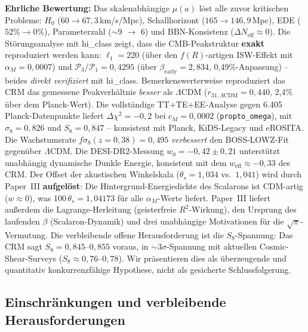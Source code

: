 \documentclass[aps,prd,twocolumn,superscriptaddress,nofootinbib,floatfix]{revtex4-2}
\begin{document}
\textbf{Ehrliche Bewertung:} Das skalenabhängige $\mu(a)$ löst alle zuvor kritischen Probleme: $H_0$ ($60 \to 67{,}3$\,km/s/Mpc), Schallhorizont ($165 \to 146{,}9$\,Mpc), EDE ($52\% \to 0\%$), Parameterzahl ($\sim$9 $\to$ 6) und BBN-Konsistenz ($\Delta N_{\mathrm{eff}} \approx 0$). Die Störungsanalyse mit hi\_class zeigt, dass die CMB-Peakstruktur \textbf{exakt} reproduziert werden kann: $\ell_1 = 220$ (über den $f(R)$-artigen ISW-Effekt mit $\alpha_M = 0{,}0007$) und $\mathcal{P}_3/\mathcal{P}_1 = 0{,}4295$ (über $\beta_{\mathrm{early}} = 2{,}834$, 0,49\%-Anpassung) -- beides \textit{direkt verifiziert} mit hi\_class. Bemerkenswerterweise reproduziert das CRM das gemessene Peakverhältnis \textit{besser} als $\Lambda$CDM ($r_{31,\Lambda\mathrm{CDM}} = 0{,}440$, 2,4\% über dem Planck-Wert). Die vollständige TT+TE+EE-Analyse gegen 6.405 Planck-Datenpunkte liefert $\Delta\chi^2 = -0{,}2$ bei $c_M = 0{,}0002$ (\texttt{propto\_omega}), mit $\sigma_8 = 0{,}826$ und $S_8 = 0{,}847$ -- konsistent mit Planck, KiDS-Legacy und eROSITA. Die Wachstumsrate $f\sigma_8(z=0{,}38) = 0{,}495$ \textit{verbessert} den BOSS-LOWZ-Fit gegenüber $\Lambda$CDM. Die DESI-DR2-Messung $w_0 = -0{,}42 \pm 0{,}21$ unterstützt unabhängig dynamische Dunkle Energie, konsistent mit dem $w_{\mathrm{eff}} \approx -0{,}33$ des CRM. Der Offset der akustischen Winkelskala ($\theta_s = 1{,}034$ vs.\ $1{,}041$) wird durch Paper~III \cite{Geiger2026c} \textbf{aufgelöst}: Die Hintergrund-Energiedichte des Scalarons ist CDM-artig ($w \approx 0$), was $100\,\theta_s = 1{,}04173$ für alle $\alpha_M$-Werte liefert. Paper~III liefert außerdem die Lagrange-Herleitung (geisterfreie $R^2$-Wirkung), den Ursprung des laufenden $\beta$ (Scalaron-Dynamik) und drei unabhängige Motivationen für die $\sqrt{\pi}$-Vermutung. Die verbleibende offene Herausforderung ist die $S_8$-Spannung: Das CRM sagt $S_8 = 0{,}845$--$0{,}855$ voraus, in $\sim 3\sigma$-Spannung mit aktuellen Cosmic-Shear-Surveys ($S_8 \approx 0{,}76$--$0{,}78$). Wir präsentieren dies als überzeugende und quantitativ konkurrenzfähige Hypothese, nicht als gesicherte Schlussfolgerung.

\subsection{Einschränkungen und verbleibende Herausforderungen}
\end{document}

